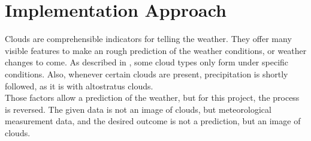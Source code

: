 \section{Implementation Approach}
\label{section:impl}
Clouds are comprehensible indicators for telling the weather. 
They offer many visible features to make an rough prediction of the weather conditions, or weather changes to come.
As described in , some cloud types only form under specific conditions.
Also, whenever certain clouds are present, \gls{precipitation} is shortly followed, as it is with altostratus clouds.
\\
Those factors allow a prediction of the weather, but for this project, the process is reversed.
The given data is not an image of clouds, but meteorological measurement data, and the desired outcome is not a prediction, but an image of clouds.

